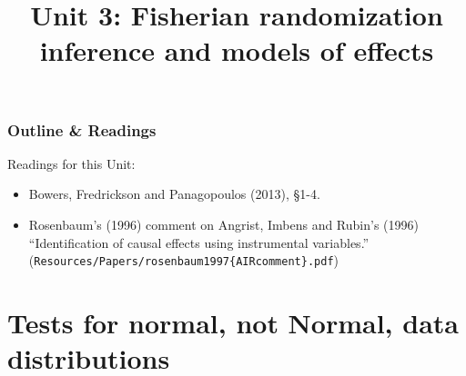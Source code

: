%



%




\title{Unit 3: Fisherian randomization inference and models of effects}




  \begin{frame}
    \frametitle{Outline \& Readings}

\tableofcontents[subsectionstyle=show/hide/hide]

  \alert{Readings for this Unit:}\\
  \begin{itemize}
  \item Bowers, Fredrickson and Panagopoulos (2013), \S1-4. 
  \item Rosenbaum's (1996) comment on Angrist, Imbens and Rubin's (1996) ``Identification of causal effects using instrumental variables.'' (\texttt{Resources/Papers/rosenbaum1997\{AIRcomment\}.pdf})
  \end{itemize}


\end{frame}

\section{Tests for normal, not Normal, data distributions}

